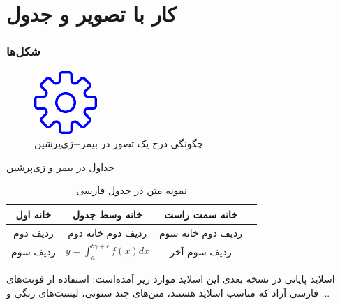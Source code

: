 \documentclass[xcolor=dvipsnames, professionalfonts, aspectratio=169, 11pt]{beamer}
\begin{document}
\begin{persian}
\begin{frame}
\end{frame}

\section{کار با تصویر و جدول}

\begin{frame}
\frametitle{شکل‌ها}
\begin{figure}
	\centering
	\includegraphics[width=0.4\linewidth]{settings-blue.pdf}
	\caption[نمونه تصویر]{چگونگی درج یک تصور در بیمر+زی‌پرشین}
	\label{fig:pic1}
\end{figure}
\end{frame}


\begin{frame}{جداول در بیمر و زی‌پرشین}
\begin{table}
\caption{نمونه متن در جدول فارسی}
\begin{tabular}{|c|c|c|c|}
	\hline 
خانه اول	& خانه وسط جدول &خانه سمت راست    \\ 
	\hline 
ردیف دوم	&  ردیف دوم خانه دوم& ردیف دوم خانه سوم   \\ 
	\hline 
ردیف سوم	&
$ y=\int_{a}^{b\gamma+\epsilon} f(x) dx $
& ردیف سوم آخر   \\ 
	\hline 
\end{tabular} 
\end{table}
\end{frame}

\begin{frame}{اسلاید پایانی}
در نسخه بعدی این اسلاید موارد زیر  آمده‌است: استفاده از فونت‌های فارسی آزاد که مناسب اسلاید هستند، متن‌های چند ستونی، لیست‌های رنگی و ...


\end{frame}
\end{persian}
\end{document}
